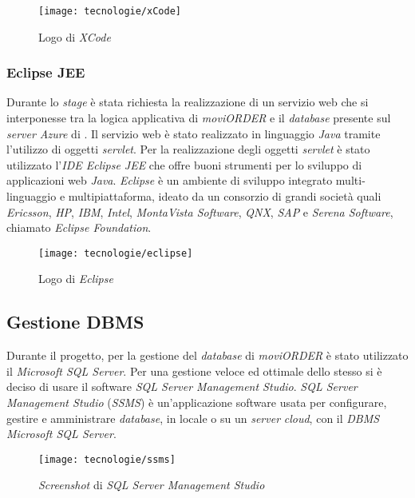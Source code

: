 \begin{figure}[!h] 
    \centering 
    \texttt{[image: tecnologie/xCode]} 
    \caption{Logo di \textit{XCode}}
\end{figure}

\subsubsection{Eclipse JEE}

Durante lo \textit{stage} è stata richiesta la realizzazione di un servizio web che si interponesse tra la logica applicativa di \textit{moviORDER} e il \textit{database} presente sul \textit{server Azure} di \visione{}. Il servizio web è stato realizzato in linguaggio \textit{Java} tramite l'utilizzo di oggetti \textit{servlet}. Per la realizzazione degli oggetti \textit{servlet} è stato utilizzato l'\textit{IDE Eclipse JEE} che offre buoni strumenti per lo sviluppo di applicazioni web \textit{Java}. \textit{Eclipse} è un ambiente di sviluppo integrato multi-linguaggio e multipiattaforma, ideato da un consorzio di grandi società quali \textit{Ericsson}, \textit{HP}, \textit{IBM}, \textit{Intel}, \textit{MontaVista Software}, \textit{QNX}, \textit{SAP} e \textit{Serena Software}, chiamato \textit{Eclipse Foundation}.

\begin{figure}[!h] 
    \centering 
    \texttt{[image: tecnologie/eclipse]} 
    \caption{Logo di \textit{Eclipse}}
\end{figure}

\subsection{Gestione DBMS}

Durante il progetto, per la gestione del \textit{database} di \textit{moviORDER} è stato utilizzato il  \textit{Microsoft SQL Server}. Per una gestione veloce ed ottimale dello stesso si è deciso di usare il software \textit{SQL Server Management Studio}. \textit{SQL Server Management Studio} (\textit{SSMS}) è un'applicazione software usata per configurare, gestire e amministrare \textit{database}, in locale o su un \textit{server} \textit{cloud}, con il \textit{DBMS Microsoft SQL Server}. 

\begin{figure}[!h] 
    \centering 
    \texttt{[image: tecnologie/ssms]} 
    \caption{\textit{Screenshot} di \textit{SQL Server Management Studio}}
\end{figure}


